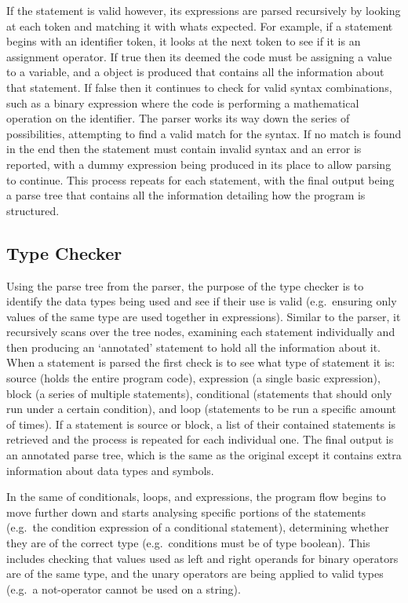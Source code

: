\documentclass[
]{report}
\begin{document}
If the statement is valid however, its expressions are parsed
recursively by looking at each token and matching it with whats
expected. For example, if a statement begins with an identifier token,
it looks at the next token to see if it is an assignment operator. If
true then its deemed the code must be assigning a value to a variable,
and a object is produced that contains all the information about that
statement. If false then it continues to check for valid syntax
combinations, such as a binary expression where the code is performing a
mathematical operation on the identifier. The parser works its way down
the series of possibilities, attempting to find a valid match for the
syntax. If no match is found in the end then the statement must contain
invalid syntax and an error is reported, with a dummy expression being
produced in its place to allow parsing to continue. This process repeats
for each statement, with the final output being a parse tree that
contains all the information detailing how the program is structured.

\subsection{Type Checker}
Using the parse tree from the parser, the purpose of the type checker is
to identify the data types being used and see if their use is valid
(e.g.~ensuring only values of the same type are used together in
expressions). Similar to the parser, it recursively scans over the tree
nodes, examining each statement individually and then producing an
`annotated' statement to hold all the information about it. When a
statement is parsed the first check is to see what type of statement it
is: source (holds the entire program code), expression (a single basic
expression), block (a series of multiple statements), conditional
(statements that should only run under a certain condition), and loop
(statements to be run a specific amount of times). If a statement is
source or block, a list of their contained statements is retrieved and
the process is repeated for each individual one. The final output is an
annotated parse tree, which is the same as the original except it
contains extra information about data types and symbols.

In the same of conditionals, loops, and expressions, the program flow
begins to move further down and starts analysing specific portions of
the statements (e.g.~the condition expression of a conditional
statement), determining whether they are of the correct type
(e.g.~conditions must be of type boolean). This includes checking that
values used as left and right operands for binary operators are of the
same type, and the unary operators are being applied to valid types
(e.g.~a not-operator cannot be used on a string).
\end{document}
